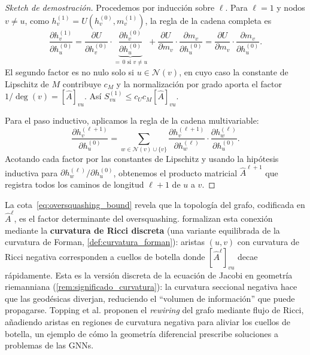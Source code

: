 \begin{proof}[Sketch de demostración]
	Procedemos por inducción sobre $\ell$. Para $\ell = 1$ y nodos $v \neq u$,
	como $h_v^{(1)} = U(h_v^{(0)}, m_v^{(1)})$, la regla de la cadena completa es
	\[
		\frac{\partial h_v^{(1)}}{\partial h_u^{(0)}}
		= \frac{\partial U}{\partial h_v^{(0)}}
		  \cdot \underbrace{\frac{\partial h_v^{(0)}}{\partial h_u^{(0)}}}_{=\,0 \text{ si } v \neq u}
		+ \frac{\partial U}{\partial m_v}
		  \cdot \frac{\partial m_v}{\partial h_u^{(0)}}
		= \frac{\partial U}{\partial m_v}
		  \cdot \frac{\partial m_v}{\partial h_u^{(0)}}.
	\]
	El segundo factor es no nulo solo si $u \in \mathcal{N}(v)$, en cuyo caso
	la constante de Lipschitz de $M$ contribuye $c_M$ y la normalización por
	grado aporta el factor $1/\deg(v) = [\hat{A}]_{vu}$. Así
	$S_{vu}^{(1)} \leq c_U c_M [\hat{A}]_{vu}$.

	Para el paso inductivo, aplicamos la regla de la cadena multivariable:
	\[
		\frac{\partial h_v^{(\ell+1)}}{\partial h_u^{(0)}} = \sum_{w \in \mathcal{N}(v) \cup \{v\}} \frac{\partial h_v^{(\ell+1)}}{\partial h_w^{(\ell)}} \cdot \frac{\partial h_w^{(\ell)}}{\partial h_u^{(0)}}.
	\]
	Acotando cada factor por las constantes de Lipschitz y usando la hipótesis inductiva para $\partial h_w^{(\ell)} / \partial h_u^{(0)}$, obtenemos el producto matricial $\hat{A}^{\ell+1}$ que registra todos los caminos de longitud $\ell+1$ de $u$ a $v$.
\end{proof}

\begin{remark}\label{rem:curvatura_oversquashing}
	La cota~\eqref{eq:oversquashing_bound} revela que la topología del grafo, codificada en $\hat{A}^\ell$, es el factor determinante del \gls{oversquashing}. \citet{topping2022understanding} formalizan esta conexión mediante la \textbf{curvatura de Ricci discreta} (una variante equilibrada de la curvatura de Forman, \autoref{def:curvatura_forman}): aristas $(u,v)$ con curvatura de Ricci negativa corresponden a cuellos de botella donde $[\hat{A}^\ell]_{vu}$ decae rápidamente. Esta es la versión discreta de la ecuación de Jacobi en geometría riemanniana (\autoref{rem:significado_curvatura}): la curvatura seccional negativa hace que las geodésicas diverjan, reduciendo el ``volumen de información'' que puede propagarse. Topping et al. proponen el \textit{rewiring} del grafo mediante flujo de Ricci, añadiendo aristas en regiones de curvatura negativa para aliviar los cuellos de botella, un ejemplo de cómo la geometría diferencial prescribe soluciones a problemas de las \glspl{GNN}.
\end{remark}

